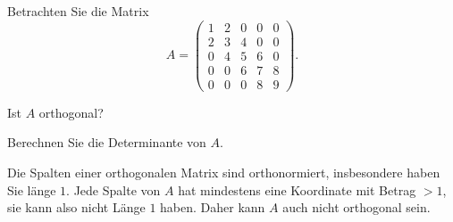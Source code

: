 Betrachten Sie die Matrix
\[
A=
\begin{pmatrix}
1&2&0&0&0\\
2&3&4&0&0\\
0&4&5&6&0\\
0&0&6&7&8\\
0&0&0&8&9
\end{pmatrix}.
\]
\begin{teilaufgaben}
\item Ist $A$ orthogonal?
\item Berechnen Sie die Determinante von $A$.
\end{teilaufgaben}


\begin{loesung}
\begin{teilaufgaben}
\item
Die Spalten einer orthogonalen Matrix sind orthonormiert,
insbesondere haben Sie länge $1$. Jede Spalte von $A$ hat mindestens eine
Koordinate mit Betrag $>1$, sie kann also nicht Länge $1$ haben.
Daher kann $A$ auch nicht orthogonal sein.


\end{teilaufgaben}
\end{loesung}
